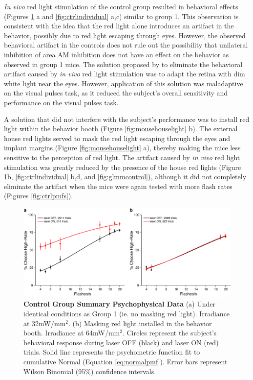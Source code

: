 \emph{In vivo} red light stimulation of the control group resulted in behavioral effects (Figures \ref{fig:ctrlsummary} a and \ref{fig:ctrlindividual} a,c) similar to group 1. This observation is consistent with the idea that the red light alone introduces an artifact in the behavior, possibly due to red light escaping through eyes. However, the observed behavioral artifact in the controls does not rule out the possibility that unilateral inhibition of area AM inhibition does not have an effect on the behavior as observed in group 1 mice. The solution proposed by  \textcite{Danskin2015} to eliminate the behavioral artifact caused by \emph{in vivo} red light stimulation was to adapt the retina with dim white light near the eyes. However, application of this solution was maladaptive on the visual pulses task, as it reduced the subject's overall sensitivity and performance on the visual pulses task. \par

A solution that did not interfere with the subject's performance was to install red light within the behavior booth (Figure \ref{fig:mousehouselight} b). The external house red lights served to mask the red light escaping through the eyes and implant margins (Figure \ref{fig:mousehouselight} a), thereby making the mice less sensitive to the perception of red light. The artifact caused by \emph{in vivo} red light stimulation was greatly reduced by the presence of the house red lights (Figure \ref{fig:ctrlsummary}b, \ref{fig:ctrlindividual} b,d, and \ref{fig:glmmcontrol}), although it did not completely eliminate the artifact when the mice were again tested with more flash rates (Figures \ref{fig:ctrlpmfs}). 
\begin{figure}
  \centering
   \includegraphics[width=\textwidth]{Figures/chapter4/jaws_controls_summaryPMFs.png}
  \caption[Control Group Summary Psychophysical Data ]{\textbf{Control Group Summary Psychophysical Data} (a) Under identical conditions as Group 1 (ie. no masking red light). Irradiance at 32mW/mm$^{2}$. (b) Masking red light installed in the behavior booth. Irradiance at 64mW/mm$^{2}$. Circles represent the subject's behavioral response during laser OFF (black) and laser ON (red) trials. Solid line represents the psychometric function fit to cumulative Normal (Equation \ref{eq:normalpmf}). Error bars represent Wilson Binomial (95\%) confidence intervals. }
   \label{fig:ctrlsummary}
\end{figure}

